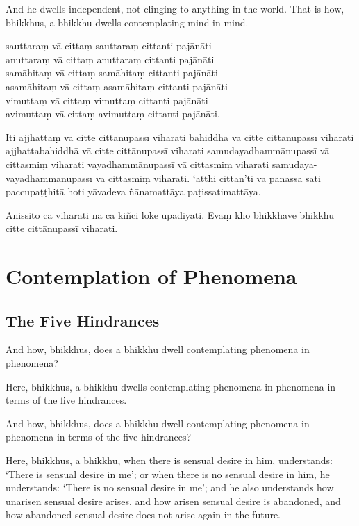 And he dwells independent, not clinging to anything in the world. That is how,
bhikkhus, a bhikkhu dwells contemplating mind in mind.


\paliPage

sauttaraṃ vā cittaṃ sauttaraṃ cittanti pajānāti\\
anuttaraṃ vā cittaṃ anuttaraṃ cittanti pajānāti\\
samāhitaṃ vā cittaṃ samāhitaṃ cittanti pajānāti\\
asamāhitaṃ vā cittaṃ asamāhitaṃ cittanti pajānāti\\
vimuttaṃ vā cittaṃ vimuttaṃ cittanti pajānāti\\
avimuttaṃ vā cittaṃ avimuttaṃ cittanti pajānāti.

Iti ajjhattaṃ vā citte cittānupassī viharati bahiddhā vā citte cittānupassī
viharati ajjhattabahiddhā vā citte cittānupassī viharati samudayadhammānupassī
vā cittasmiṃ viharati vayadhammānupassī vā cittasmiṃ viharati
samudaya-vayadhammānupassī vā cittasmiṃ viharati. `atthi cittan'ti vā panassa
sati paccupaṭṭhitā hoti yāvadeva ñāṇamattāya paṭissatimattāya.

Anissito ca viharati na ca kiñci loke upādiyati. Evaṃ kho bhikkhave bhikkhu
citte cittānupassī viharati.


\englishPage

\paliPage

\englishPage
\chapter{Contemplation of Phenomena}

\section{The Five Hindrances}

And how, bhikkhus, does a bhikkhu dwell contemplating phenomena in phenomena?

Here, bhikkhus, a bhikkhu dwells contemplating phenomena in phenomena in terms
of the five hindrances.

And how, bhikkhus, does a bhikkhu dwell contemplating phenomena in phenomena in
terms of the five hindrances?

Here, bhikkhus, a bhikkhu,
when there is sensual desire in him, understands:
`There is sensual desire in me';
or when there is no sensual desire in him, he understands:
`There is no sensual desire in me';
and he also understands how unarisen sensual desire arises,
and how arisen sensual desire is abandoned,
and how abandoned sensual desire does not arise again in the future.

